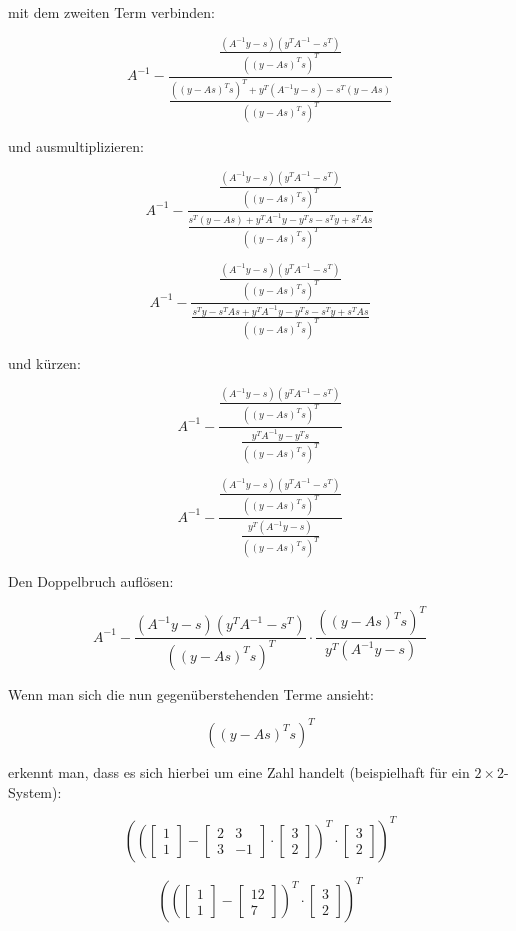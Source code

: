 \documentclass[a4paper, 12pt]{report}
\begin{document}
mit dem zweiten Term verbinden:

$$ A^{-1} - \frac{ \frac{ (A^{-1}y-s)(y^TA^{-1}-s^T) }{\left( (y-As)^Ts\right)^T } }{ \frac{ \left( (y-As)^Ts\right)^T + y^T(A^{-1}y - s) - s^T(y - As) }{\left( (y-As)^Ts\right)^T}}$$

und ausmultiplizieren:

$$ A^{-1} - \frac{ \frac{ (A^{-1}y-s)(y^TA^{-1}-s^T) }{\left( (y-As)^Ts\right)^T } }{ \frac{ s^T(y - As) + y^TA^{-1}y - y^Ts - s^Ty + s^TAs }{\left( (y-As)^Ts\right)^T}}$$

$$ A^{-1} - \frac{ \frac{ (A^{-1}y-s)(y^TA^{-1}-s^T) }{\left( (y-As)^Ts\right)^T } }{ \frac{ s^Ty - s^TAs + y^TA^{-1}y - y^Ts - s^Ty + s^TAs }{\left( (y-As)^Ts\right)^T}}$$

und kürzen:

$$ A^{-1} - \frac{ \frac{ (A^{-1}y-s)(y^TA^{-1}-s^T) }{\left( (y-As)^Ts\right)^T } }{ \frac{ y^TA^{-1}y - y^Ts }{\left( (y-As)^Ts\right)^T}}$$

$$ A^{-1} - \frac{ \frac{ (A^{-1}y-s)(y^TA^{-1}-s^T) }{\left( (y-As)^Ts\right)^T } }{ \frac{ y^T(A^{-1}y - s) }{\left( (y-As)^Ts\right)^T}}$$

Den Doppelbruch auflösen:

$$ A^{-1} - \frac{ (A^{-1}y-s)(y^TA^{-1}-s^T) }{\left( (y-As)^Ts\right)^T } \cdot \frac{ \left( (y-As)^Ts\right)^T }{ y^T(A^{-1}y - s) }$$

Wenn man sich die nun gegenüberstehenden Terme ansieht:

$$\left( (y-As)^Ts\right)^T$$

erkennt man, dass es sich hierbei um eine Zahl handelt (beispielhaft für ein $2\times 2$-System):

$$\left( \left(\begin{bmatrix}1\\1\end{bmatrix} - \begin{bmatrix}2 & 3\\3 & -1\end{bmatrix}\cdot \begin{bmatrix}3\\2\end{bmatrix} \right)^T\cdot \begin{bmatrix}3\\2\end{bmatrix} \right)^T$$

$$\left( \left(\begin{bmatrix}1\\1\end{bmatrix} - \begin{bmatrix}12\\7\end{bmatrix} \right)^T \cdot \begin{bmatrix}3\\2\end{bmatrix} \right)^T$$
\end{document}
